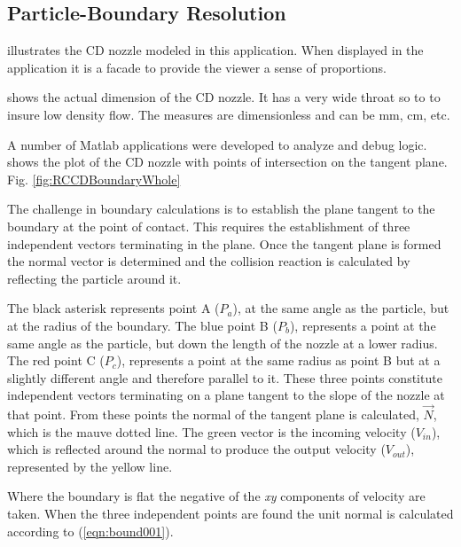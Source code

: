 \newpage
\clearpage
\subsection{Particle-Boundary Resolution} \label{pbh}

 illustrates the CD nozzle modeled in this application. When displayed in the application it is a facade to provide the viewer a sense of proportions. 



 shows the actual dimension of the CD nozzle. It has a very wide throat so to to insure low density flow. The measures are dimensionless and can be mm, cm, etc. 


A number of Matlab applications were developed to analyze and debug logic.  shows the plot of the CD nozzle with points of intersection on the tangent plane. 
Fig. \ref{fig:RCCDBoundaryWhole}


The challenge in boundary calculations is to establish the plane tangent to the boundary at the point of contact. This requires the establishment of three independent vectors terminating in the plane. Once the tangent plane is formed the normal vector is determined and the collision reaction is calculated by reflecting the particle around it. 

The black asterisk represents point A ($P_a$), at the same angle as the particle, but at the radius of the boundary. The blue point B ($P_b$), represents a point at the same angle as the particle, but down the length of the nozzle at a lower radius. The red point C ($P_c$), represents a point at the same radius as point B but at a slightly different angle and therefore parallel to it. These three points constitute independent vectors terminating on a plane tangent to the slope of the nozzle at that point. From these points the normal of the tangent plane is calculated, $\vec{N}$, which is the mauve dotted line. The green vector is the incoming velocity ($V_{in}$), which is reflected around the normal to produce the output velocity ($V_{out}$), represented by the yellow line.


Where the boundary is flat the negative of the \textit{xy} components of velocity are taken. When the three independent points are found the unit normal is calculated according to (\ref{eqn:bound001}).


